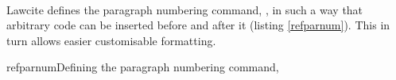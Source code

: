 



\usepackage[
				bookmarks,
            colorlinks=true,        
            allcolors = black,  
            citecolor=blue,        
            pageanchor=true,
            plainpages=false,
            hyperindex=false, 
]{hyperref}


\newcommand\illus[2]{\bigskip\noindent\fbox{#1}\\#2}

\newcommand\theball{\tikz \shade[ball color=green!40] (0,0) circle (0.75ex);\hspace{0.75em}}



\maketitle


\setindexhyperlinks
\let\xoldtwocolumn\twocolumn
\iftoggle{printlegtoc}{%
\let\oldtwocolumn\twocolumn
\renewcommand{\twocolumn}[1][]{#1}
\let\oldclearpage\clearpage
\renewcommand\clearpage{\relax}
\extendtheindex{}{\useindexpreamble}{}{}
\printindex[cases]
\printindex[legislation]
\iftoggle{printregulations}{\printindex[regulations]}{}
\renewcommand{\twocolumn}[1][]{\oldtwocolumn}
\renewcommand\clearpage{\oldclearpage}
}{}
\bigskip
\hfill{}\hfill\ %
\bigskip

Lawcite defines the paragraph numbering command, , in such a way that arbitrary code can be inserted before and after it (listing \ref{refparnum}). This in turn allows easier customisable formatting.
 
\begin{dov}{refparnum}{Defining the paragraph numbering command, }
\renewcommand{\theparno}{\arabic{parno}}
\newcommand{\p}{%
   \refstepcounter{parno}%
   \noindent\numparshiftleft{%
   \savebox{\mybox}{%
      \mbox{\numparformat%
         \numpardelimleft%
         \theparno%
         \numpardelimright%
         }}%
   \usebox{\mybox}}%
   \label{para.\theparno}%
   \numparfillright%
   \numparindent%
   \numpardelimpost%
   }
\end{dov}

